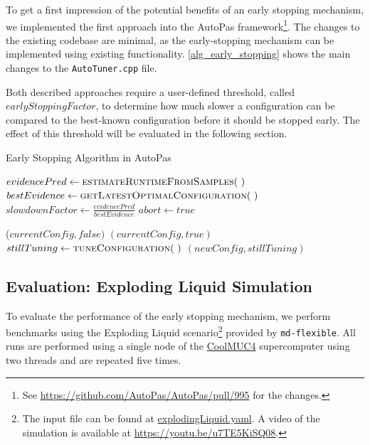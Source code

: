 \documentclass[conference]{IEEEtran}
\begin{document}
To get a first impression of the potential benefits of an early stopping mechanism, we implemented the first approach into the AutoPas framework\footnote{
    See \href{https://github.com/AutoPas/AutoPas/pull/995}{
        https://github.com/AutoPas/AutoPas/pull/995} for the changes.
}. The changes to the existing codebase are minimal, as the early-stopping mechanism can be implemented using existing functionality. \autoref{alg_early_stopping} shows the main changes to the \texttt{AutoTuner.cpp} file.

Both described approaches require a user-defined threshold, called $earlyStoppingFactor$, to determine how much slower a configuration can be compared to the best-known configuration before it should be stopped early. The effect of this threshold will be evaluated in the following section.

\begin{algorithm}[h]
    \small
    \caption{Early Stopping Algorithm in AutoPas}
    \label{alg_early_stopping}
    \begin{algorithmic}[1]
        \State \Return
        \EndIf
        \State $evidencePred \gets \Call{estimateRuntimeFromSamples}{~}$
        \State $bestEvidence \gets \Call{getLatestOptimalConfiguration}{~}$
        \State $slowdownFactor \gets \frac{evidencePred}{bestEvidence}$
        \State $abort \gets true$
        \EndIf
        \EndProcedure

        \vspace{0.2em}

        \State \Return ($currentConfig, false)$
            \State \Return $(currentConfig, true)$
            \Else
            \State $stillTuning \gets \Call{tuneConfiguration}{~}$
            \State \Return $(newConfig, stillTuning)$
        \EndIf
        \EndProcedure
    \end{algorithmic}
\end{algorithm}

\subsection{Evaluation: Exploding Liquid Simulation}
\label{sec:evaluation}

To evaluate the performance of the early stopping mechanism, we perform benchmarks using the Exploding Liquid scenario\footnote{
    The input file can be found at \href{
        https://github.com/AutoPas/AutoPas/blob/master/examples/md-flexible/input/explodingLiquid.yaml}{explodingLiquid.yaml}.
    A video of the simulation is available at \url{https://youtu.be/u7TE5KiSQ08}.
} provided by \texttt{md-flexible}. All runs are performed using a single node of the \href{https://doku.lrz.de/coolmuc-4-1082337877.html}{CoolMUC4} supercomputer using two threads and are repeated five times.
\end{document}

